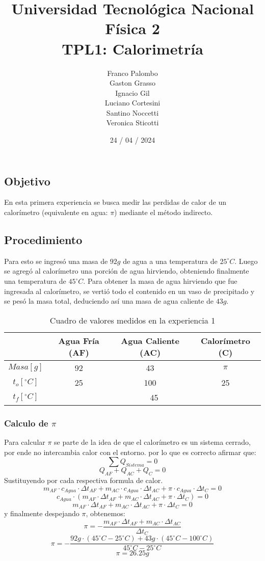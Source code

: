 \documentclass[12pt]{report}
\title{%
  \fontsize{25}{0}\selectfont Universidad Tecnológica Nacional \\
  \fontsize{22}{30}\selectfont Física 2 \\
  \fontsize{18}{25}\selectfont TPL1: Calorimetría
}
\author{
Franco Palombo\\
Gaston Grasso\\
Ignacio Gil\\
Luciano Cortesini\\
Santino Noccetti\\
Veronica Sticotti
}
\date{24 / 04 / 2024}
\begin{document}
\maketitle

\chapter{}
\section{Objetivo}
En esta primera experiencia se busca medir las perdidas de calor de un calorímetro (equivalente en agua: $\pi$) mediante el método indirecto. 

\section{Procedimiento}
Para esto se ingresó una masa de $92 g$ de agua a una temperatura de $25^\circ C$.
Luego se agregó al calorímetro una porción de agua hirviendo, obteniendo finalmente una temperatura de  $45^\circ C$. 
Para obtener la masa de agua hirviendo que fue ingresada al calorímetro, se vertió todo el contenido en un vaso de precipitado y se pesó la masa total, deduciendo así una masa de agua caliente de $43g$.
\begin{table}[htbp!]
    \centering
    \begin{tabular}{|c|c|c|c|}
    \hline
    & Agua Fría (AF) & Agua Caliente (AC) & Calorímetro (C)\\
    \hline
    $Masa[g]$ & 92 & 43 & $\pi$ \\
    \hline
    $t_o[^\circ C]$ & 25 & 100 & 25\\
    \hline
    $t_f[^\circ C]$ & \multicolumn{3}{|c|}{45}\\
    \hline
    \end{tabular}
    \caption{Cuadro de valores medidos en la experiencia 1}
    \label{tab:datos experiencia 1}
\end{table}
\subsection{Calculo de $\pi$}
Para calcular $\pi$ se parte de la idea de que el calorímetro es un sistema cerrado, por ende no intercambia calor con el entorno. por lo que es correcto afirmar que:
$$\sum Q_{Sistema}= 0$$
$$Q_{AF} + Q_{AC} + Q_{C} = 0$$
\hspace{1cm} Sustituyendo por cada respectiva formula de calor.
$$m_{AF} \cdot c_{Agua} \cdot {\Delta t}_{AF} + m_{AC} \cdot c_{Agua} \cdot {\Delta t}_{AC} + \pi \cdot c_{Agua} \cdot {\Delta t}_{C} = 0$$
$$c_{Agua} \cdot (m_{AF}  \cdot {\Delta t}_{AF} + m_{AC} \cdot {\Delta t}_{AC} + \pi \cdot {\Delta t}_C) = 0$$
$$m_{AF} \cdot  {\Delta t}_{AF} + m_{AC} \cdot  {\Delta t}_{AC} + \pi \cdot {\Delta t}_C= 0$$
\hspace{1cm} y finalmente despejando $\pi$, obtenemos:
$$\pi =-\frac{m_{AF} \cdot  {\Delta t}_{AF} + m_{AC} \cdot  {\Delta t}_{AC}}{{\Delta t}_C}$$
$$\pi =-\frac{92g \cdot (45^\circ C-25^\circ C)+ 43g \cdot (45^\circ C-100^\circ C)}{45^\circ C-25^\circ C}$$
$$\pi = 26.25g$$
\end{document}
